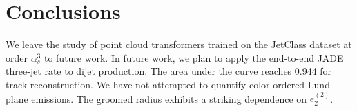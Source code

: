 \section{Conclusions}\label{sec:conclusions}

We leave the study of point cloud transformers trained on the JetClass
dataset at order $\alpha_s^3$ to future work. In future work, we plan to
apply the end-to-end JADE three-jet rate to dijet production. The area
under the curve reaches 0.944 for track reconstruction. We have not
attempted to quantify color-ordered Lund plane emissions. The groomed
radius exhibits a striking dependence on $e_2^{(2)}$.

